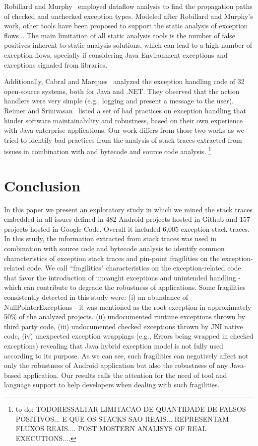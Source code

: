 \documentclass[conference]{IEEEtran}
\begin{document}
Robillard and Murphy~\cite{Robil00}
employed dataflow analysis to find the propagation paths of checked and
unchecked exception types. Modeled after Robillard and Murphy's work, other
tools have been proposed to support the static analysis of exception
flows~\cite{coelho2008assessing}. The main limitation of all
static analysis tools is the number of false positives inherent to static analysis
solutions, which can lead to a high number of exception flows, specially if
considering Java Environment exceptions and exceptions signaled from libraries.
 
Additionally, Cabral and Marques~\cite{cabral2007exception} analyzed the
exception handling code of 32 open-source systems, both for Java and .NET. They
observed that the action handlers were very simple (e.g., logging and present a
message to the user). Reimer and Srinivasan~\cite{reimer2003analyzing} listed a
set of bad practices on exception handling that hinder software maintainability
and robustness, based on their own experience with Java enterprise applications.
Our work differs from those two works as we tried to identify bad practices from
the analysis of stack traces extracted from issues in combination with and bytecode and source
code analysis. \footnote{ to do: TODORESSALTAR LIMITACAO DE QUANTIDADE DE FALSOS POSITIVOS... E QUE OS STACKS SAO REAIS...
REPRESENTAM FLUXOS REAIS.... POST MOSTERN ANALISYS OF REAL EXECUTIONS....}

\enlargethispage{-2\baselineskip}

\section{Conclusion}
\label{sec:conc}

In this paper we present an exploratory study in which we mined the stack 
traces embedded in all issues defined in 482 Android projects hosted in Github and 
157 projects hosted in Google Code. Overall it included 6,005 exception stack traces.
In this study, the information extracted from stack traces was used in combination 
with source code and bytecode analysis to identify common characteristics of exception 
stack traces and pin-point fragilities on the exception-related code. 
We call ``fragilities" characteristics on the exception-related code that favor the introduction
of  uncaught exceptions and unintended handling - which can contribute to 
degrade the robustness of applications.
Some fragilities consistently detected in this study were: 
(i) an abundance of NullPointerExceptions - it was mentioned as the root exception in approximately 
50\% of the analyzed projects. 
(ii) undocumented runtime exceptions thrown by third party code,
(iii) undocumented checked exceptions thrown by JNI native code,
(iv) unexpected exception wrappings (e.g., Errors being wrapped in checked exceptions) 
revealing that Java hybrid exception model is not fully used according to its purpose.
As we can see, such fragilities can negatively affect not only the robustness of Android application 
but also the robustness of any Java-based application. 
Our results calls the attention for the need of tool and language support to help 
developers when dealing with such fragilities.
\end{document}
